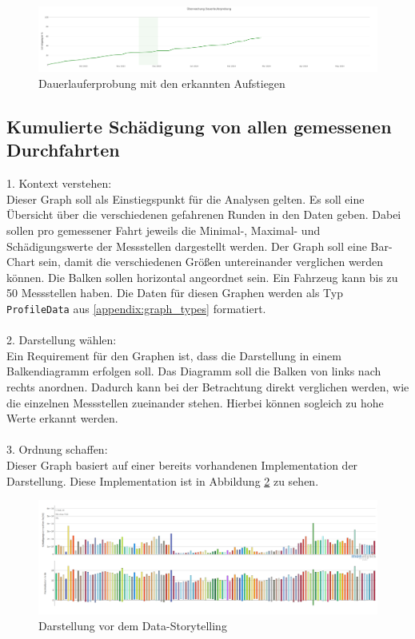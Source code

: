 \begin{figure}[!h]
    \centering
    \includegraphics[width=1\linewidth]{gfx/dauerlauferprobung_story.png}
    \caption{Dauerlauferprobung mit den erkannten Aufstiegen}
    \label{fig:dauerlauferprobung_story}
\end{figure}

\subsection{Kumulierte Schädigung von allen gemessenen Durchfahrten}
\label{section:schaedigung}
1. Kontext verstehen:\\
Dieser Graph soll als Einstiegspunkt für die Analysen gelten. Es soll eine Übersicht über die verschiedenen gefahrenen Runden in den Daten geben. Dabei sollen pro gemessener Fahrt jeweils die Minimal-, Maximal- und Schädigungswerte der Messstellen dargestellt werden. Der Graph soll eine Bar-Chart sein, damit die verschiedenen Größen untereinander verglichen werden können. Die Balken sollen horizontal angeordnet sein. Ein Fahrzeug kann bis zu 50 Messstellen haben. Die Daten für diesen Graphen werden als Typ \texttt{ProfileData} aus \ref{appendix:graph_types} formatiert. 
\\\\
2. Darstellung wählen:\\
Ein Requirement für den Graphen ist, dass die Darstellung in einem Balkendiagramm erfolgen soll. Das Diagramm soll die Balken von links nach rechts anordnen. Dadurch kann bei der Betrachtung direkt verglichen werden, wie die einzelnen Messstellen zueinander stehen. Hierbei können sogleich zu hohe Werte erkannt werden.\\\\
3. Ordnung schaffen:\\
Dieser Graph basiert auf einer bereits vorhandenen Implementation der Darstellung. Diese Implementation ist in Abbildung \ref{fig:schaedigung_before} zu sehen.
\begin{figure}[!h]
    \centering
    \includegraphics[width=1\linewidth]{gfx/schaedigung.png}
    \caption{Darstellung vor dem Data-Storytelling}
    \label{fig:schaedigung_before}
\end{figure}
